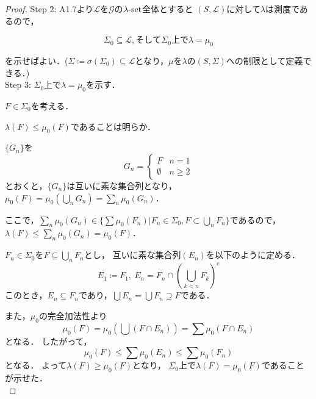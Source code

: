 \documentclass{jsarticle}
\begin{document}
\begin{proof}
Step 2:
A1.7より$\mathcal{L}$を$\mathcal{G}$の$\lambda{\rm \text{-}set}$全体とすると
$(S,\mathcal{L})$に対して$\lambda$は測度であるので，

\begin{equation}
    \Sigma_0\subseteq\mathcal{L}, そして \Sigma_0 上で \lambda=\mu_0
\end{equation}

を示せばよい．($\Sigma\coloneqq\sigma(\Sigma_0)\subseteq\mathcal{L}$となり，$\mu$を$\lambda$の$(S,\Sigma)$への制限として定義できる．)
\\

Step 3: $\Sigma_0 上で \lambda=\mu_0$を示す．

$F\in\Sigma_0$を考える．

$\lambda(F)\leq\mu_0(F)$であることは明らか．
\begin{itembox}{}
    $\{G_n\}$を
    \begin{equation}
        G_n=\left\{
        \begin{array}{ll}
        F & n=1 \\
        \emptyset & n\geq 2
        \end{array}
        \right. \nonumber
    \end{equation}
    とおくと，$\{G_n\}$は互いに素な集合列となり，
    $\mu_0(F)=\mu_0(\bigcup_n G_n)=\sum_n\mu_0(G_n)$．
    
    ここで，$\sum_n\mu_0(G_n)\in\{\sum\mu_0(F_n)|F_n\in\Sigma_0,F\subset\bigcup_n F_n\}$であるので，
    $\lambda(F) \leq \sum_n\mu_0(G_n)=\mu_0(F)$．
\end{itembox}

$F_n\in\Sigma_0$を$F\subseteq\bigcup_n F_n$とし，
互いに素な集合列$(E_n)$を以下のように定める．
\begin{equation}
    E_1\coloneqq F_1 ,\ E_n=F_n\cap\left(\bigcup_{k<n}F_k\right)^c \nonumber
\end{equation}
このとき，$E_n\subseteq F_n$であり，$\bigcup E_n=\bigcup F_n\supseteq F$である．

また，$\mu_0$の完全加法性より
\begin{equation}
    \mu_0(F)=\mu_0\left(\bigcup(F\cap E_n)\right)=\sum\mu_0(F\cap E_n) \nonumber
\end{equation}
となる．
したがって，
\begin{equation}
    \mu_0(F) \leq \sum\mu_0(E_n) \leq \sum\mu_0(F_n)
\end{equation}
となる．
よって$\lambda(F)\geq\mu_0(F)$となり，
$\Sigma_0$上で$\lambda(F)=\mu_0(F)$であることが示せた．
\\


\end{proof}
\end{document}
